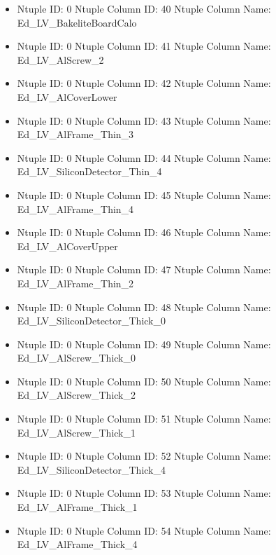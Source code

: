 \documentclass[8pt]{beamer}
\begin{document}
\begin{frame}
\begin{itemize}
        \item Ntuple ID: 0 Ntuple Column ID: 40 Ntuple Column Name: Ed\_LV\_BakeliteBoardCalo
        
        \item Ntuple ID: 0 Ntuple Column ID: 41 Ntuple Column Name: Ed\_LV\_AlScrew\_2
        
        \item Ntuple ID: 0 Ntuple Column ID: 42 Ntuple Column Name: Ed\_LV\_AlCoverLower
        
        \item Ntuple ID: 0 Ntuple Column ID: 43 Ntuple Column Name: Ed\_LV\_AlFrame\_Thin\_3
        
        \item Ntuple ID: 0 Ntuple Column ID: 44 Ntuple Column Name: Ed\_LV\_SiliconDetector\_Thin\_4
        
        \item Ntuple ID: 0 Ntuple Column ID: 45 Ntuple Column Name: Ed\_LV\_AlFrame\_Thin\_4
        
        \item Ntuple ID: 0 Ntuple Column ID: 46 Ntuple Column Name: Ed\_LV\_AlCoverUpper
        
        \item Ntuple ID: 0 Ntuple Column ID: 47 Ntuple Column Name: Ed\_LV\_AlFrame\_Thin\_2
        
        \item Ntuple ID: 0 Ntuple Column ID: 48 Ntuple Column Name: Ed\_LV\_SiliconDetector\_Thick\_0
        
        \item Ntuple ID: 0 Ntuple Column ID: 49 Ntuple Column Name: Ed\_LV\_AlScrew\_Thick\_0
        
        \item Ntuple ID: 0 Ntuple Column ID: 50 Ntuple Column Name: Ed\_LV\_AlScrew\_Thick\_2
        
        \item Ntuple ID: 0 Ntuple Column ID: 51 Ntuple Column Name: Ed\_LV\_AlScrew\_Thick\_1
        
        \item Ntuple ID: 0 Ntuple Column ID: 52 Ntuple Column Name: Ed\_LV\_SiliconDetector\_Thick\_4
        
        \item Ntuple ID: 0 Ntuple Column ID: 53 Ntuple Column Name: Ed\_LV\_AlFrame\_Thick\_1
        
        \item Ntuple ID: 0 Ntuple Column ID: 54 Ntuple Column Name: Ed\_LV\_AlFrame\_Thick\_4
        

\end{itemize}
\end{frame}
\end{document}
